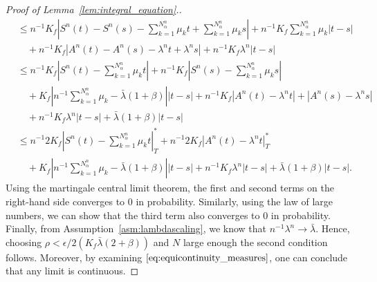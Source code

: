 \documentclass[a4paper,11pt,twoside]{article}
\numberwithin{equation}{section}
\numberwithin{figure}{section}
\theoremstyle{plain}
\newcommand{\1}{\mathbbm{1}}
\begin{document}
\begin{proof}[Proof of Lemma~\ref{lem:integral_equation}.]
\begin{align}
       \nonumber& \leq  n^{-1}K_f \left|S^n(t) - S^n(s)-\sum_{k=1}^{N^n_\alpha}\mu_kt +\sum_{k=1}^{N^n_\alpha}\mu_ks\right| + n^{-1}K_f\sum_{k=1}^{N^n_\alpha}\mu_k  \left|t-s\right|\\
       \nonumber&\quad+ n^{-1}K_f \left|A^n(t) - A^n(s)-\lambda^nt +\lambda^ns\right| + n^{-1}K_f\lambda^n  \left|t-s\right| \\
       \nonumber& \leq  n^{-1}K_f \left|S^n(t) - \sum_{k=1}^{N^n_\alpha}\mu_kt\right| +n^{-1}K_f\left|S^n(s) -\sum_{k=1}^{N^n_\alpha}\mu_ks\right|\\
       \nonumber&\quad + K_f\left|n^{-1}\sum_{k=1}^{N^n_\alpha}\mu_k-\bar{\lambda}(1+\beta)\right|  \left|t-s\right|+ n^{-1}K_f \left|A^n(t) - \lambda^nt\right| +\left|A^n(s)-\lambda^ns\right|\\
       \nonumber&\quad + n^{-1}K_f\lambda^n  \left|t-s\right| + \bar{\lambda}(1+\beta) \left|t-s\right|\\
       \nonumber& \leq  n^{-1}2K_f \left|S^n(t) - \sum_{k=1}^{N^n_\alpha}\mu_kt\right|_T^* +n^{-1}2K_f\left|A^n(t) - \lambda^nt\right|_T^*\\
       &\quad + K_f\left|n^{-1}\sum_{k=1}^{N^n_\alpha}\mu_k-\bar{\lambda}(1+\beta)\right|  \left|t-s\right| + n^{-1}K_f\lambda^n  \left|t-s\right| + \bar{\lambda}(1+\beta) \left|t-s\right|.
       \label{eq:equicontinuity_measures}
   \end{align}
   Using the martingale central limit theorem, the first and second terms on the right-hand side converges to 0 in probability. Similarly, using the law of large numbers, we can show that the third term also converges to 0 in probability. Finally, from Assumption~\ref{asm:lambdascaling}, we know that $n^{-1}\lambda^n\to \bar{\lambda}$. Hence, choosing $\rho<\epsilon/2(K_f\bar{\lambda}(2+\beta))$ and $N$ large enough the second condition follows. Moreover, by examining $\eqref{eq:equicontinuity_measures}$, one can conclude that any limit is continuous. 


\end{proof}
\end{document}
